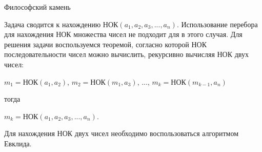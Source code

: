 \begin{tutorial}{Философский камень}

Задача сводится к нахождению НОК$(a_1,a_2,a_3,...,a_n)$. Использование перебора для нахождения НОК множества чисел не подходит для в этого случая. Для решения задачи воспользуемся теоремой, согласно которой НОК последовательности чисел можно вычислить, рекурсивно вычисляя НОК двух чисел:
\begin{center}
$m_1=$НОК$(a_1, a_2)$, $m_2=$НОК$(m_1,a_3)$, ..., $m_k=$НОК$(m_{k-1},a_n)$
\end{center}
тогда
\begin{center}
$m_k=$НОК$(a_1,a_2,a_3,...,a_n)$.
\end{center}
Для нахождения НОК двух чисел необходимо воспользоваться алгоритмом Евклида.

\end{tutorial}
